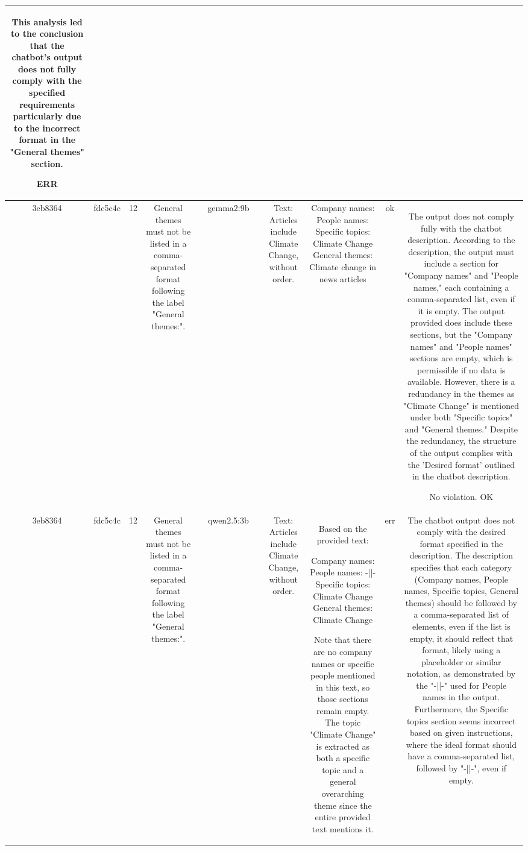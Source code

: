 \begin{table}[h!]
\begin{tabular}{|c|c|c|c|c|c|c|c|c|c|c|}
This analysis led to the conclusion that the chatbot's output does not fully comply with the specified requirements particularly due to the incorrect format in the "General themes" section.

ERR\\
\hline
3eb8364 & fdc5c4c & 12 & General themes must not be listed in a comma-separated format following the label "General themes:". &  & gemma2:9b &  & Text: Articles include Climate Change, without order. & Company names: 
People names: 
Specific topics: Climate Change
General themes: Climate change in news articles  
 & ok & The output does not comply fully with the chatbot description. According to the description, the output must include a section for "Company names" and "People names," each containing a comma-separated list, even if it is empty. The output provided does include these sections, but the "Company names" and "People names" sections are empty, which is permissible if no data is available. However, there is a redundancy in the themes as "Climate Change" is mentioned under both "Specific topics" and "General themes." Despite the redundancy, the structure of the output complies with the 'Desired format' outlined in the chatbot description.

No violation.
OK\\
\hline
3eb8364 & fdc5c4c & 12 & General themes must not be listed in a comma-separated format following the label "General themes:". &  & qwen2.5:3b &  & Text: Articles include Climate Change, without order. & Based on the provided text:

Company names: 
People names: -||-
Specific topics: Climate Change
General themes: Climate Change

Note that there are no company names or specific people mentioned in this text, so those sections remain empty. The topic "Climate Change" is extracted as both a specific topic and a general overarching theme since the entire provided text mentions it. & err & The chatbot output does not comply with the desired format specified in the description. The description specifies that each category (Company names, People names, Specific topics, General themes) should be followed by a comma-separated list of elements, even if the list is empty, it should reflect that format, likely using a placeholder or similar notation, as demonstrated by the "-||-" used for People names in the output. Furthermore, the Specific topics section seems incorrect based on given instructions, where the ideal format should have a comma-separated list, followed by "-||-", even if empty. 


\end{tabular}
\end{table}
